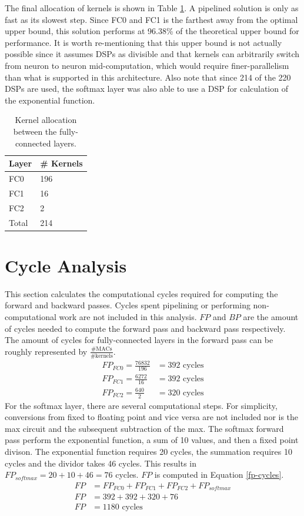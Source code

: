 The final allocation of kernels is shown in Table \ref{dsp-allocat}. A pipelined solution is only as fast as its slowest step. Since FC0 and FC1 is the farthest away from the optimal upper bound, this solution performs at 96.38\% of the theoretical upper bound for performance. It is worth re-mentioning that this upper bound is not actually possible since it assumes DSPs as divisible and that kernels can arbitrarily switch from neuron to neuron mid-computation, which would require finer-parallelism than what is supported in this architecture. Also note that since 214 of the 220 DSPs are used, the softmax layer was also able to use a DSP for calculation of the exponential function.

\begin{table}
	\centering 
	\begin{tabular}{|l|l|}
		\hline 
		Layer & \# Kernels \\\hline
		FC0 & 196 \\\hline
		FC1 & 16 \\\hline
		FC2 & 2	\\\hline
		Total & 214	\\\hline
	\end{tabular}
	\caption{Kernel allocation between the fully-connected layers.}
	\label{dsp-allocat}
\end{table}

\section{Cycle Analysis}
This section calculates the computational cycles required for computing the forward and backward passes. Cycles spent pipelining or performing non-computational work are not included in this analysis. $FP$ and $BP$ are the amount of cycles needed to compute the forward pass and backward pass respectively. The amount of cycles for fully-connected layers in the forward pass can be roughly represented by $\frac{\# \text{MACs}}{\# \text{kernels}}$.
\begin{align}
	FP_{FC0} = \frac{76832}{196} &= 392\text{ cycles}\\	
	FP_{FC1} = \frac{6272}{16} &= 392 \text{ cycles}\\
	FP_{FC2} = \frac{640}{2} &= 320 \text{ cycles}	
\end{align}
For the softmax layer, there are several computational steps. For simplicity, conversions from fixed to floating point and vice versa are not included nor is the max circuit and the subsequent subtraction of the max. The softmax forward pass perform the exponential function, a sum of 10 values, and then a fixed point divison. The exponential function requires 20 cycles, the summation requires 10 cycles and the dividor takes 46 cycles. This results in $FP_{softmax} = 20 + 10 + 46 = 76$ cycles. $FP$ is computed in Equation \ref{fp-cycles}.
\begin{align}
	FP &= FP_{FC0} + FP_{FC1} + FP_{FC2} + FP_{softmax} \\
	FP &= 392 + 392 + 320 + 76\\
	FP &= 1180	 \text{ cycles} \label{fp-cycles}
\end{align}

